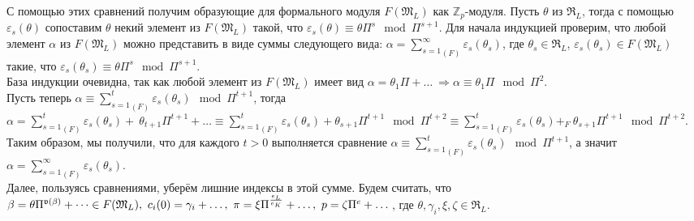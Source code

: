 \documentclass[a4paper]{article}
\newcommand{\Zp}{\mathbb{Z}_p}
\newcommand{\ML}{\mathfrak{M}_L}
\newcommand{\RL}{\mathfrak{R}_L}
\newcommand{\val}{\mathfrak{v}}
\begin{document}
С помощью этих сравнений получим образующие для формального модуля $F(\ML)$ как $\Zp$-модуля. Пусть $\theta$ из $\RL$, тогда с помощью $\varepsilon_s(\theta)$ сопоставим $\theta$ некий элемент из $F(\ML)$ такой, что $\varepsilon_s(\theta)\equiv\theta\Pi^s\mod\Pi^{s+1}$. 
Для начала индукцией проверим, что любой элемент $\alpha$ из $F(\ML)$ можно представить в виде суммы следующего вида: $\alpha={\sum\limits_{s=1}^\infty}_{(F)}\varepsilon_s(\theta_s)$, где $\theta_s\in\RL$, $\varepsilon_s(\theta_s)\in F(\ML)$ такие, что $\varepsilon_s(\theta_s)\equiv\theta\Pi^s\mod\Pi^{s+1}$.\\
База индукции очевидна, так как любой элемент из $F(\ML)$ имеет вид $\alpha=\theta_1\Pi+\dots\ \Rightarrow \alpha\equiv\theta_1\Pi\mod\Pi^2$.\\
Пусть теперь $\alpha\equiv{\sum\limits_{s=1}^t}_{(F)}\varepsilon_s(\theta_s)\mod\Pi^{t+1}$, тогда $\alpha={\sum\limits_{s=1}^t}_{(F)}\varepsilon_s(\theta_s) +\ \theta_{t+1}\Pi^{t+1}+\dots \equiv {\sum\limits_{s=1}^t}_{(F)}\varepsilon_s(\theta_s) + \theta_{s+1}\Pi^{t+1}\mod\Pi^{t+2}\equiv {\sum\limits_{s=1}^t}_{(F)}\varepsilon_s(\theta_s) +_{F}\ \theta_{s+1}\Pi^{t+1}\mod\Pi^{t+2}$.
Таким образом, мы получили, что для каждого $t>0$ выполняется сравнение $\alpha\equiv{\sum\limits_{s=1}^t}_{(F)}\varepsilon_s(\theta_s)\mod\Pi^{t+1}$, а значит $\alpha={\sum\limits_{s=1}^\infty}_{(F)}\varepsilon_s(\theta_s)$. \\

Далее, пользуясь сравнениями, уберём лишние индексы в этой сумме. Будем считать, что $\beta=\theta\Pi^{\val(\beta)}+\dots\in F(\ML),\ c_i(0)=\gamma_i+\dots,\ \pi=\xi\Pi^{e_L\over e_K}+\dots,\ p=\zeta\Pi^e+\dots$, где $\theta,\gamma_i,\xi,\zeta\in\RL$.
\end{document}
